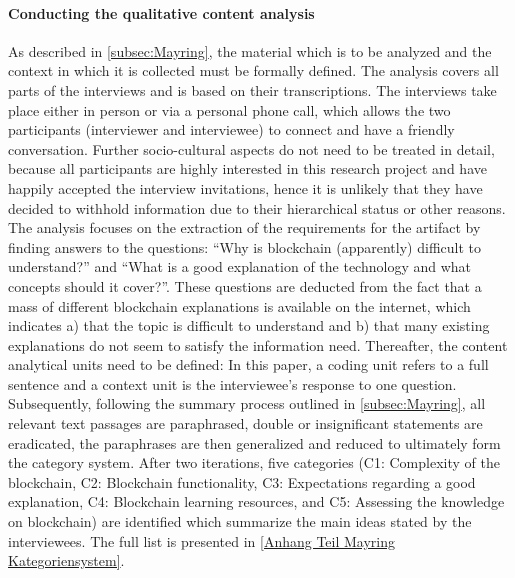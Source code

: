 \paragraph{Conducting the qualitative content analysis} As described in \ref{subsec:Mayring}, the material which is to be analyzed and the context in which it is collected must be formally defined. The analysis covers all parts of the interviews and is based on their transcriptions. The interviews take place either in person or via a personal phone call, which allows the two participants (interviewer and interviewee) to connect and have a friendly conversation. Further socio-cultural aspects do not need to be treated in detail, because all participants are highly interested in this research project and have happily accepted the interview invitations, hence it is unlikely that they have decided to withhold information due to their hierarchical status or other reasons. The analysis focuses on the extraction of the requirements for the artifact by finding answers to the questions: \enquote{Why is blockchain (apparently) difficult to understand?} and \enquote{What is a good explanation of the technology and what concepts should it cover?}. These questions are deducted from the fact that a mass of different blockchain explanations is available on the internet, which indicates a) that the topic is difficult to understand and b) that many existing explanations do not seem to satisfy the information need. Thereafter, the content analytical units need to be defined: In this paper, a coding unit refers to a full sentence and a context unit is the interviewee's response to one question. Subsequently, following the summary process outlined in \ref{subsec:Mayring}, all relevant text passages are paraphrased, double or insignificant statements are eradicated, the paraphrases are then generalized and reduced to ultimately form the category system. After two iterations, five categories (C1: Complexity of the blockchain, C2: Blockchain functionality, C3: Expectations regarding a good explanation, C4: Blockchain learning resources, and C5: Assessing the knowledge on blockchain) are identified which summarize the main ideas stated by the interviewees. The full list is presented in \ref{Anhang Teil Mayring Kategoriensystem}.

